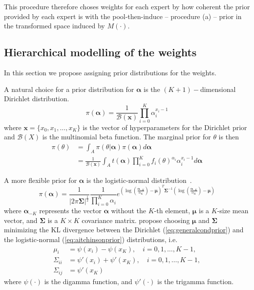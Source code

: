 \documentclass[a4paper, notitlepage, 10pt]{article}
\begin{document}
This procedure therefore choses weights for each expert by how coherent the prior provided by each expert is with the pool-then-induce -- procedure (a) -- prior in the transformed space induced by $M(\cdot)$.

\subsection*{Hierarchical modelling of the weights}

In this section we propose assigning prior distributions for the weights.

A natural choice for a prior distribution for $\boldsymbol\alpha$ is the $(K+1)-$dimensional Dirichlet distribution.
\begin{equation}
 \label{eq:generalcondprior}
 \pi(\boldsymbol\alpha) = \frac{1}{\mathcal{B}(\boldsymbol x)}\prod_{i=0}^K \alpha_i^{x_i-1}
\end{equation}
where $\boldsymbol x = \{ x_0, x_1, \ldots, x_K\}$ is the vector of hyperparameters for the Dirichlet prior and $\mathcal{B}(X)$ is the multinomial beta function.
The marginal prior for $\theta$ is then
\begin{align}
 \label{eq:marginalhierprior}
 \pi(\theta) &= \int_{A}\pi(\theta|\boldsymbol\alpha)\pi(\boldsymbol\alpha)d\boldsymbol\alpha \\
             &= \frac{1}{\mathcal{B}(\boldsymbol x)}\int_{A}t(\boldsymbol\alpha)\prod_{i=0}^K f_i(\theta)^{\alpha_i}\alpha_i^{x_i-1}d\boldsymbol\alpha 
\end{align}


A more flexible prior for $\boldsymbol\alpha$ is the logistic-normal distribution~\citep{aitchson1980}. 
\begin{equation}
 \label{eq:aitchinsonprior}
 \pi(\boldsymbol\alpha) = \frac{1}{|2\pi \boldsymbol \Sigma|^{\frac{1}{2}}}\frac{1}{\prod_{i=0}^K \alpha_i}
  e^{
     \left(\log\left(\frac{\boldsymbol \alpha_{-K}}{\alpha_K}\right) - \boldsymbol \mu\right)^T
     {\boldsymbol \Sigma}^{-1}
     \left(\log\left(\frac{\boldsymbol \alpha_{-K}}{\alpha_K}\right) - \boldsymbol \mu\right)
     }
\end{equation}
where $\boldsymbol \alpha_{-K}$ represents the vector $\boldsymbol \alpha$ without the $K$-th element, $\boldsymbol \mu$ is a $K$-size mean vector, and $\boldsymbol \Sigma$ is a $K \times K$ covariance matrix. \citet{aitchson1980} propose choosing $\boldsymbol \mu$ and $\boldsymbol \Sigma$ minimizing the KL divergence between the Dirichlet (\ref{eq:generalcondprior}) and the logistic-normal (\ref{eq:aitchinsonprior}) distributions, i.e.
\begin{align}
 \label{eq:momentmatching}
 \mu_i & = \psi(x_i) - \psi(x_K), \quad i=0,1,\ldots,K-1, \\
 \Sigma_{ii} & = \psi'(x_i) + \psi'(x_K), \quad i=0,1,\ldots,K-1, \\
 \Sigma_{ij} & = \psi'(x_K)
\end{align}
where $\psi(\cdot)$ is the digamma function, and $\psi'(\cdot)$ is the trigamma function.
\end{document}
